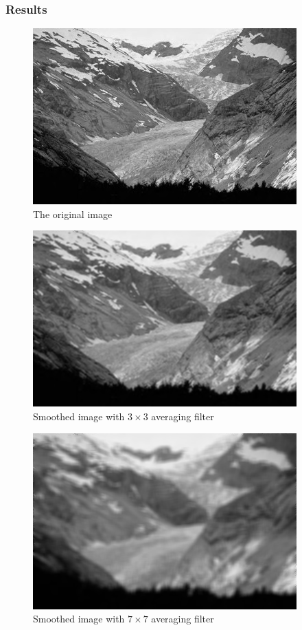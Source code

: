 \documentclass{article}
\begin{document}
\subsubsection{Results}

\begin{figure}[H]
	\centering
	\includegraphics[width=288pt]{../img/02.png}
	\caption{The original image}
\end{figure}

\begin{figure}[H]
	\centering
	\includegraphics[width=288pt]{../result/filter-smooth-3-3.png}
	\caption{Smoothed image with $3 \times 3$ averaging filter}
\end{figure}

\begin{figure}[H]
	\centering
	\includegraphics[width=288pt]{../result/filter-smooth-7-7.png}
	\caption{Smoothed image with $7 \times 7$ averaging filter}
\end{figure}
\end{document}
